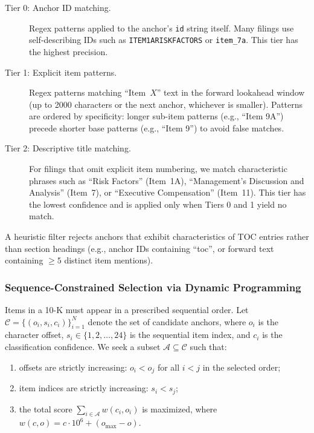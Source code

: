 \documentclass[12pt,letterpaper,oneside]{article}
\begin{document}
\begin{description}
  \item[Tier 0: Anchor ID matching.]
    Regex patterns applied to the anchor's \texttt{id} string itself.
    Many filings use self-describing IDs such as
    \texttt{ITEM1ARISKFACTORS} or \texttt{item\_7a}.
    This tier has the highest precision.

  \item[Tier 1: Explicit item patterns.]
    Regex patterns matching ``Item~$X$'' text in the forward
    lookahead window (up to 2000 characters or the next anchor,
    whichever is smaller). Patterns are ordered by specificity:
    longer sub-item patterns (e.g., ``Item 9A'') precede shorter
    base patterns (e.g., ``Item 9'') to avoid false matches.

  \item[Tier 2: Descriptive title matching.]
    For filings that omit explicit item numbering, we match
    characteristic phrases such as ``Risk Factors'' (Item~1A),
    ``Management's Discussion and Analysis'' (Item~7), or
    ``Executive Compensation'' (Item~11). This tier has the lowest
    confidence and is applied only when Tiers 0 and 1 yield no match.
\end{description}

A heuristic filter rejects anchors that exhibit characteristics of
TOC entries rather than section headings (e.g., anchor IDs containing
``toc'', or forward text containing $\geq 5$ distinct item mentions).

\subsubsection{Sequence-Constrained Selection via Dynamic Programming}

Items in a 10-K must appear in a prescribed sequential order. Let
$\mathcal{C} = \{(o_i, s_i, c_i)\}_{i=1}^{N}$ denote the set of
candidate anchors, where $o_i$ is the character offset, $s_i \in
\{1, 2, \ldots, 24\}$ is the sequential item index, and $c_i$ is
the classification confidence. We seek a subset
$\mathcal{A} \subseteq \mathcal{C}$ such that:
\begin{enumerate}
  \item offsets are strictly increasing: $o_i < o_j$ for all
        $i < j$ in the selected order;
  \item item indices are strictly increasing: $s_i < s_j$;
  \item the total score $\sum_{i \in \mathcal{A}} w(c_i, o_i)$ is
        maximized, where $w(c, o) = c \cdot 10^6 + (o_{\max} - o)$.
\end{enumerate}
\end{document}
